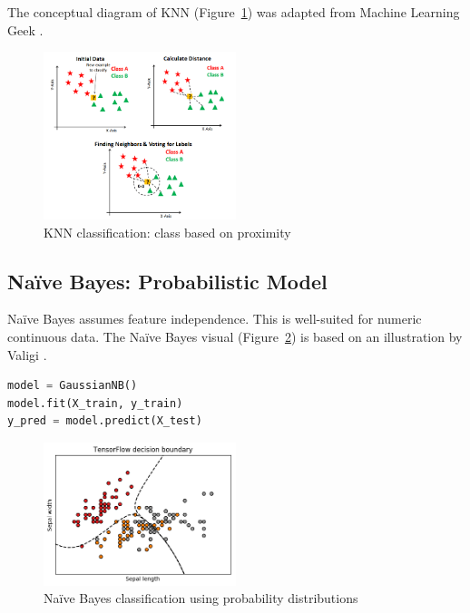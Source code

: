 The conceptual diagram of KNN (Figure~\ref{fig:knn_diagram}) was adapted from Machine Learning Geek \cite{knn_diagram}.

\begin{figure}[H]
    \centering
    \includegraphics[width=0.5\textwidth]{figures/knn_illustration.png}
    \caption{KNN classification: class based on proximity}
    \label{fig:knn_diagram}
\end{figure}

\subsection{Naïve Bayes: Probabilistic Model}
\label{sec:method_nb}

Naïve Bayes assumes feature independence. This is well-suited for numeric continuous data. The Naïve Bayes visual (Figure~\ref{fig:nb_diagram}) is based on an illustration by Valigi \cite{naive_bayes_diagram}.

\begin{lstlisting}[language=Python, caption={Naïve Bayes model snippet}, label=list:nb_code]
model = GaussianNB()
model.fit(X_train, y_train)
y_pred = model.predict(X_test)
\end{lstlisting}

\begin{figure}[H]
    \centering
    \includegraphics[width=0.5\textwidth]{figures/naive_bayes_concept.png}
    \caption{Naïve Bayes classification using probability distributions}
    \label{fig:nb_diagram}
\end{figure}

